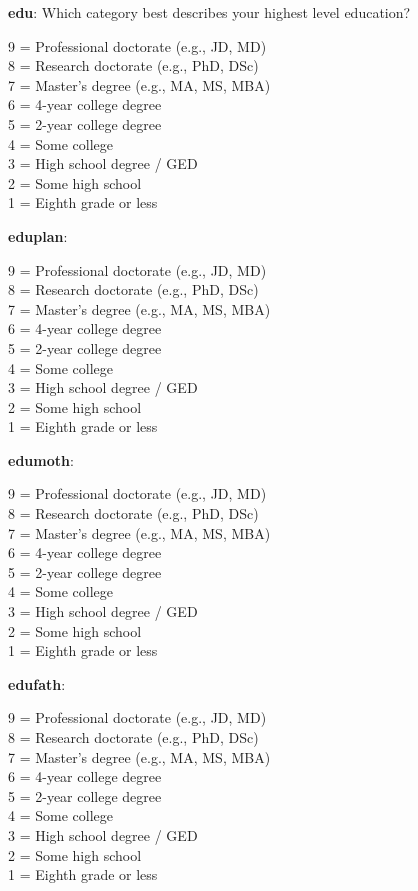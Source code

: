 \documentclass[11pt, headsepline]{article}
\begin{document}
\textbf{edu}: Which category best describes your highest level education?

9 = Professional doctorate (e.g., JD, MD) \\
8 = Research doctorate (e.g., PhD, DSc) \\ 
7 = Master’s degree (e.g., MA, MS, MBA) \\
6 = 4-year college degree \\ 
5 = 2-year college degree \\ 
4 = Some college \\ 
3 = High school degree / GED \\ 
2 = Some high school \\ 
1 = Eighth grade or less

\textbf{eduplan}:

9 = Professional doctorate (e.g., JD, MD) \\
8 = Research doctorate (e.g., PhD, DSc) \\ 
7 = Master’s degree (e.g., MA, MS, MBA) \\
6 = 4-year college degree \\ 
5 = 2-year college degree \\ 
4 = Some college \\ 
3 = High school degree / GED \\ 
2 = Some high school \\ 
1 = Eighth grade or less

\textbf{edumoth}:

9 = Professional doctorate (e.g., JD, MD) \\
8 = Research doctorate (e.g., PhD, DSc) \\ 
7 = Master’s degree (e.g., MA, MS, MBA) \\
6 = 4-year college degree \\ 
5 = 2-year college degree \\ 
4 = Some college \\ 
3 = High school degree / GED \\ 
2 = Some high school \\ 
1 = Eighth grade or less

\textbf{edufath}:

9 = Professional doctorate (e.g., JD, MD) \\
8 = Research doctorate (e.g., PhD, DSc) \\ 
7 = Master’s degree (e.g., MA, MS, MBA) \\
6 = 4-year college degree \\ 
5 = 2-year college degree \\ 
4 = Some college \\ 
3 = High school degree / GED \\ 
2 = Some high school \\ 
1 = Eighth grade or less
\end{document}
